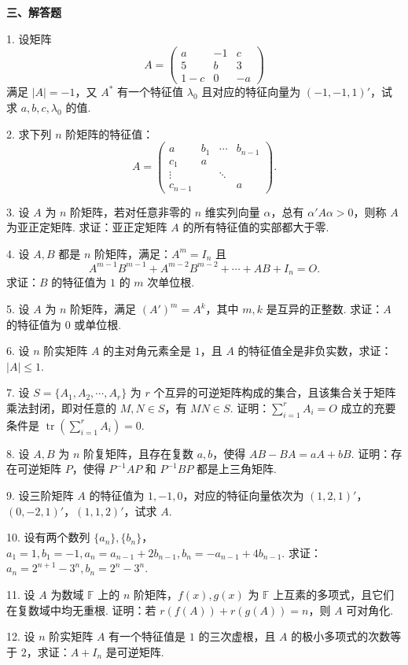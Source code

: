 \documentclass[UTF8,12pt,a4paper,fontset=fandol]{ctexart}
\begin{document}
\noindent\textbf{三、解答题}

1. 设矩阵
\[
A=\begin{pmatrix}a&-1&c\\5&b&3\\1-c&0&-a\end{pmatrix}
\]
满足 $|A|=-1$，又 $A^*$ 有一个特征值 $\lambda_0$ 且对应的特征向量为 $(-1,-1,1)'$，试求 $a,b,c,\lambda_0$ 的值.

2. 求下列 $n$ 阶矩阵的特征值：
\[
A=
\begin{pmatrix}
a&b_1&\cdots&b_{n-1}\\
c_1&a&&\\
\vdots&&\ddots&\\
c_{n-1}&&&a
\end{pmatrix}.
\]

3. 设 $A$ 为 $n$ 阶矩阵，若对任意非零的 $n$ 维实列向量 $\alpha$，总有 $\alpha'A\alpha>0$，则称 $A$ 为亚正定矩阵. 求证：亚正定矩阵 $A$ 的所有特征值的实部都大于零.

4. 设 $A,B$ 都是 $n$ 阶矩阵，满足：$A^m=I_n$ 且
\[
A^{m-1}B^{m-1}+A^{m-2}B^{m-2}+\cdots+AB+I_n=O.
\]
求证：$B$ 的特征值为 $1$ 的 $m$ 次单位根.

5. 设 $A$ 为 $n$ 阶矩阵，满足 $(A')^m=A^k$，其中 $m,k$ 是互异的正整数. 求证：$A$ 的特征值为 $0$ 或单位根.

6. 设 $n$ 阶实矩阵 $A$ 的主对角元素全是 $1$，且 $A$ 的特征值全是非负实数，求证：$|A|\le 1$.

7. 设 $S=\{A_1,A_2,\cdots,A_r\}$ 为 $r$ 个互异的可逆矩阵构成的集合，且该集合关于矩阵乘法封闭，即对任意的 $M,N\in S$，有 $MN\in S$. 证明：$\sum_{i=1}^rA_i=O$ 成立的充要条件是 $\operatorname{tr}(\sum_{i=1}^rA_i)=0$.

8. 设 $A,B$ 为 $n$ 阶复矩阵，且存在复数 $a,b$，使得 $AB-BA=aA+bB$. 证明：存在可逆矩阵 $P$，使得 $P^{-1}AP$ 和 $P^{-1}BP$ 都是上三角矩阵.

9. 设三阶矩阵 $A$ 的特征值为 $1,-1,0$，对应的特征向量依次为 $(1,2,1)'$，$(0,-2,1)'$，$(1,1,2)'$，试求 $A$.

10. 设有两个数列 $\{a_n\},\{b_n\}$，$a_1=1,b_1=-1,a_n=a_{n-1}+2b_{n-1},b_n=-a_{n-1}+4b_{n-1}$. 求证：$a_n=2^{n+1}-3^n,b_n=2^n-3^n$.

11. 设 $A$ 为数域 $\mathbb{F}$ 上的 $n$ 阶矩阵，$f(x),g(x)$ 为 $\mathbb{F}$ 上互素的多项式，且它们在复数域中均无重根. 证明：若 $r(f(A))+r(g(A))=n$，则 $A$ 可对角化.

12. 设 $n$ 阶实矩阵 $A$ 有一个特征值是 $1$ 的三次虚根，且 $A$ 的极小多项式的次数等于 $2$，求证：$A+I_n$ 是可逆矩阵.
\end{document}
